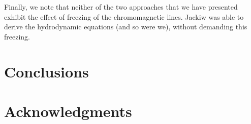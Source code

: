 \documentclass[epsfig,12pt]{article}
\begin{document}
\vspace{1cm}
	Finally, we note that neither of the two approaches that we have presented exhibit the effect
	of freezing of the chromomagnetic lines.
	Jackiw was able to derive the hydrodynamic equations (and so were we), without demanding
	this freezing.
	



\section{Conclusions}




\section*{Acknowledgments}

\small
\begin{thebibliography}{99}
\itemsep -2pt

\end{thebibliography}
\end{document}

